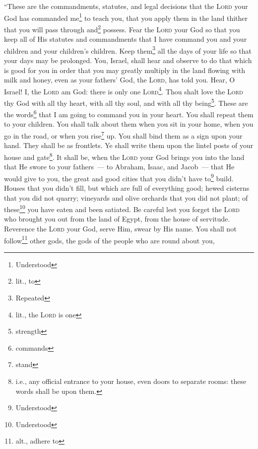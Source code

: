 
\begin{inparaenum}
     ``These are the commandments, statutes, and legal decisions that the \textsc{Lord} your God has commanded me\footnote{Understood} to teach you, that you apply them in the land thither that you will pass through and\footnote{lit., to} possess.%
     Fear the \textsc{Lord} your God so that you keep all of His statutes and commandments that I have command you and your children and your children's children. Keep them\footnote{Repeated} all the days of your life so that your days may be prolonged.%
     You, Israel, shall hear and observe to do that which is good for you in order that you may greatly multiply in the land flowing with milk and honey, even as your fathers' God, the \textsc{Lord}, has told you.%
     Hear, O Israel! I, the \textsc{Lord} am God: there is only one \textsc{Lord}\footnote{lit., the \textsc{Lord} is one}.%
     Thou shalt love the \textsc{Lord} thy God with all thy heart, with all thy soul, and with all thy being\footnote{strength}.%
     These are the words\footnote{commands} that I am going to command you in your heart.%
     You shall repeat them to your children. You shall talk about them when you sit in your home, when you go in the road, or when you rise\footnote{stand} up.%
     You shall bind them as a sign upon your hand. They shall be as frontlets.%
     Ye shall write them upon the lintel posts of your house and gate\footnote{i.e., any official entrance to your house, even doors to separate rooms: these words shall be upon them.}.%
     It shall be, when the \textsc{Lord} your God brings you into the land that He swore to your fathers~--- to Abraham, Isaac, and Jacob~--- that He would give to you, the great and good cities that you didn't have to\footnote{Understood} build.%
     Houses that you didn't fill, but which are full of everything good; hewed cisterns that you did not quarry; vineyards and olive orchards that you did not plant; of these\footnote{Understood} you have eaten and been satiated.%
     Be careful lest you forget the \textsc{Lord} who brought you out from the land of Egypt, from the house of servitude.%
     Reverence the \textsc{Lord} your God, serve Him, swear by His name.%
     You shall not follow\footnote{alt., adhere to} other gods, the gods of the people who are round about you,%

\end{inparaenum}
